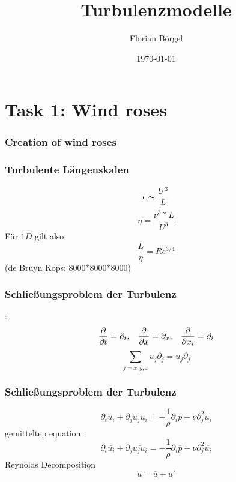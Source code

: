 \documentclass[12pt,t]{beamer}
\title[Theoretische Ozeanographie]{Turbulenzmodelle}
\author[Florian Börgel]{Florian Börgel}
\date{\today}
\institute{Universität Oldenburg}
\begin{document}
\frame{\titlepage}

\section{Task 1: Wind roses}
\begin{frame}
	\frametitle{Creation of wind roses}

\end{frame}


\begin{frame}
	\frametitle{Turbulente Längenskalen}
\begin{equation}
\epsilon\thicksim \frac{U^3}{L}
\end{equation}
\begin{equation}
\eta = \frac{\nu^3 * L}{U^3}
\end{equation}
Für $1D$ gilt also:
\begin{equation}
\frac{L}{\eta} = Re^{3/4} 
\end{equation}
(de Bruyn Kops: 8000*8000*8000)
\end{frame}

\begin{frame}
	\frametitle{Schließungsproblem der Turbulenz}
			:
\begin{equation}
\frac{\partial}{\partial t} = \partial_t, \hspace{0.3 cm}\frac{\partial}{\partial x} = \partial_x,\hspace{0.3 cm} \frac{\partial}{\partial x_i} = \partial_i
\end{equation}
\begin{equation}
\sum_{j=x,y,z}u_j\partial_j = u_j\partial_j
\end{equation}
\end{frame}


\begin{frame}
\frametitle{Schließungsproblem der Turbulenz}
\begin{equation}
\partial_t u_i + \partial_j u_ju_i = -\frac{1}{\rho}\partial_i p + \nu\partial^2_j u_i
\end{equation}
gemitteltep equation:
\begin{equation}
\partial_t \overline{u_i} + \partial_j \overline{u_ju_i} = -\frac{1}{\rho}\partial_i \overline{p} + \nu\partial^2_j \overline{u_i}
\end{equation}
Reynolds Decomposition
\begin{equation}
u = \overline{u} + u'
\end{equation}
\end{frame}
\end{document}

